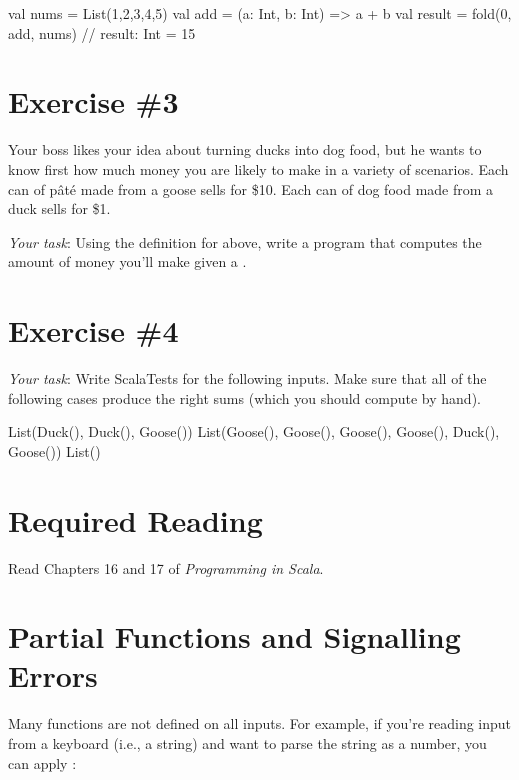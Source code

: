 \documentclass{book}
\begin{document}
\begin{scalacode}
val nums = List(1,2,3,4,5)
val add = (a: Int, b: Int) => a + b
val result = fold(0, add, nums)
// result: Int = 15
\end{scalacode}

\section{Exercise \#3}

Your boss likes your idea about turning ducks into dog food, but he wants to know first how much money you are likely to make in a variety of scenarios.  Each can of p\^at\'e made from a goose sells for \$10.  Each can of dog food made from a duck sells for \$1.

\emph{Your task}: Using the definition for  above, write a program that computes the amount of money you'll make given a .

\section{Exercise \#4}

\emph{Your task}: Write ScalaTests for the following inputs.  Make sure that all of the following cases produce the right sums (which you should compute by hand).

\begin{scalacode}
List(Duck(), Duck(), Goose())
List(Goose(), Goose(), Goose(), Goose(), Duck(), Goose())
List()
\end{scalacode}



\newlecture

\section{Required Reading}

Read Chapters 16 and 17 of \emph{Programming in Scala}.

\section{Partial Functions and Signalling Errors}

Many functions are not defined on all inputs. For example, if you're reading
input from a keyboard (i.e., a string) and want to parse the string as a
number, you can apply :
\end{document}
